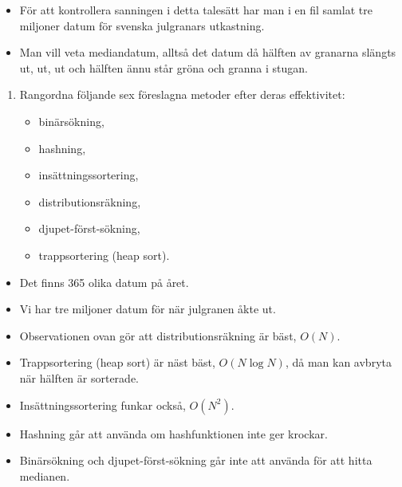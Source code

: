 \begin{frame}
  \begin{exercise}
    \begin{itemize}
      \item För att kontrollera sanningen i detta talesätt har man i en fil 
        samlat tre miljoner datum för svenska julgranars utkastning.
      \item Man vill veta mediandatum, alltså det datum då hälften av granarna 
        slängts ut, ut, ut och hälften ännu står gröna och granna i stugan.
    \end{itemize}
    \begin{enumerate}
      \item Rangordna följande sex föreslagna metoder efter deras effektivitet:
        \begin{itemize}
          \item binärsökning,
          \item hashning,
          \item insättningssortering,
          \item distributionsräkning,
          \item djupet-först-sökning,
          \item trappsortering (heap sort).
        \end{itemize}
    \end{enumerate}
  \end{exercise}
\end{frame}

\begin{frame}
  \begin{remark}
    \begin{itemize}
      \item Det finns 365 olika datum på året.
      \item Vi har tre miljoner datum för när julgranen åkte ut.
    \end{itemize}
  \end{remark}
  \begin{solution}
    \begin{itemize}
      \item Observationen ovan gör att distributionsräkning är bäst, \(O(N)\).
      \item Trappsortering (heap sort) är näst bäst, \(O(N\log N)\), då man kan 
        avbryta när hälften är sorterade.
      \item Insättningssortering funkar också, \(O(N^2)\).
      \item Hashning går att använda om hashfunktionen inte ger krockar.
      \item Binärsökning och djupet-först-sökning går inte att använda för att 
        hitta medianen.
    \end{itemize}
  \end{solution}
\end{frame}

